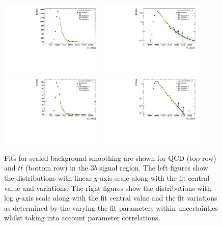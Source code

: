 \begin{figure}[htbp!]
\begin{center}
\includegraphics[width=0.45\textwidth,angle=-90]{figures/boosted/Smooth/qcd_est_ThreeTag_Signal_mHH_pole.pdf}
\includegraphics[width=0.45\textwidth,angle=-90]{figures/boosted/Smooth/qcd_est_ThreeTag_Signal_mHH_pole_l.pdf}\\
%   
\includegraphics[width=0.45\textwidth,angle=-90]{figures/boosted/Smooth/ttbar_est_ThreeTag_Signal_mHH_pole.pdf}
\includegraphics[width=0.45\textwidth,angle=-90]{figures/boosted/Smooth/ttbar_est_ThreeTag_Signal_mHH_pole_l.pdf}\\
\caption{Fits for scaled background smoothing are shown for QCD (top row) and $t\bar{t}$ (bottom row) in the $3b$ signal region.  The left figures show the distributions with linear $y$-axis scale along with the fit central value and variations. The right figures show the  distributions with log $y$-axis scale along with the fit central value and the fit variations as determined by the varying the fit parameters within uncertainties whilst taking into account parameter correlations. }
\label{fig:signal-region-mjjscaled-3b-smoothing}
\end{center}
\end{figure}


